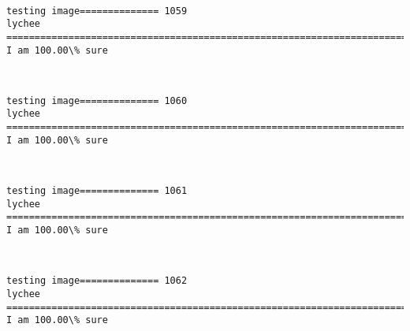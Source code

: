 \documentclass[11pt]{article}
\begin{document}
    \begin{center}
    \end{center}
    { \hspace*{\fill} \\}
    
    \begin{Verbatim}[commandchars=\\\{\}]
testing image============== 1059
lychee
============================================================================
I am 100.00\% sure

    \end{Verbatim}

    \begin{center}
    \end{center}
    { \hspace*{\fill} \\}
    
    \begin{Verbatim}[commandchars=\\\{\}]
testing image============== 1060
lychee
============================================================================
I am 100.00\% sure

    \end{Verbatim}

    \begin{center}
    \end{center}
    { \hspace*{\fill} \\}
    
    \begin{Verbatim}[commandchars=\\\{\}]
testing image============== 1061
lychee
============================================================================
I am 100.00\% sure

    \end{Verbatim}

    \begin{center}
    \end{center}
    { \hspace*{\fill} \\}
    
    \begin{Verbatim}[commandchars=\\\{\}]
testing image============== 1062
lychee
============================================================================
I am 100.00\% sure

    \end{Verbatim}
\end{document}
